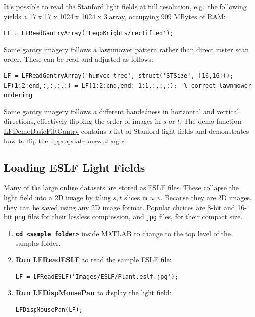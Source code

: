 \documentclass[onecolumn]{article}
\newcommand{\CiteFunction}[1]{\hyperlink{#1}{\small #1}}
\newcommand{\SymbolText}[1]{\texttt{\small #1}}
\begin{document}
It's possible to read the Stanford light fields at full resolution, e.g.\ the following yields a 17 x 17 x 1024 x 1024 x 3 array, occupying 909 MBytes of RAM:
\begin{Verbatim}
LF = LFReadGantryArray('LegoKnights/rectified');
\end{Verbatim}
  
Some gantry imagery follows a lawnmower pattern rather than direct raster scan order.  These can be read and adjusted as follows:
\begin{Verbatim}
LF = LFReadGantryArray('humvee-tree', struct('STSize', [16,16]));
LF(1:2:end,:,:,:,:) = LF(1:2:end,end:-1:1,:,:,:);  % correct lawnmower ordering
\end{Verbatim}

Some gantry imagery follows a different handedness in horizontal and vertical directions, effectively flipping the order of images in $s$ or $t$.  The demo function \CiteFunction{LFDemoBasicFiltGantry} contains a list of Stanford light fields and demonstrates how to flip the appropriate ones along $s$.

\subsection{Loading ESLF Light Fields}
\label{sect_LoadingESLFTour}

Many of the large online datasets are stored as ESLF files. These collapse the light field into a 2D image by tiling $s,t$ slices in $u,v$. Because they are 2D images, they can be saved using any 2D image format. Popular choices are 8-bit and 16-bit \SymbolText{png} files for their lossless compression, and \SymbolText{jpg} files, for their compact size.  

\begin{enumerate}

\item \textbf{\SymbolText{cd <sample folder>}} inside MATLAB to change to the top level of the samples folder.

\item \textbf{Run \CiteFunction{LFReadESLF}} to read the sample ESLF file:
\begin{Verbatim}
LF = LFReadESLF('Images/ESLF/Plant.eslf.jpg');
\end{Verbatim}

\item \textbf{Run \CiteFunction{LFDispMousePan}} to display the light field:
\begin{Verbatim}
LFDispMousePan(LF);
\end{Verbatim}
\end{enumerate}
\end{document}
